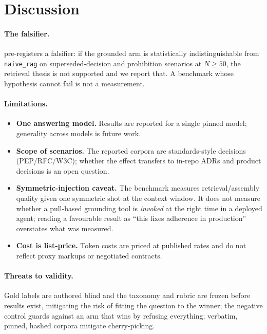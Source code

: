\section{Discussion}

\paragraph{The falsifier.} \benchname{} pre-registers a falsifier: if the grounded
arm is statistically indistinguishable from \texttt{naive\_rag} on
superseded-decision and prohibition scenarios at $N \geq 50$, the retrieval thesis
is not supported and we report that. A benchmark whose hypothesis cannot fail is
not a measurement. 

\paragraph{Limitations.}
\begin{itemize}
  \item \textbf{One answering model.} Results are reported for a single pinned
        model; generality across models is future work. 
  \item \textbf{Scope of scenarios.} The reported corpora are standards-style
        decisions (PEP/RFC/W3C); whether the effect transfers to in-repo ADRs and
        product decisions is an open question.
  \item \textbf{Symmetric-injection caveat.} The benchmark measures
        retrieval/assembly quality given one symmetric shot at the context window.
        It does not measure whether a pull-based grounding tool is \emph{invoked}
        at the right time in a deployed agent; reading a favourable result as
        ``this fixes adherence in production'' overstates what was measured.
  \item \textbf{Cost is list-price.} Token costs are priced at published rates and
        do not reflect proxy markups or negotiated contracts.
\end{itemize}

\paragraph{Threats to validity.} Gold labels are authored blind and the taxonomy
and rubric are frozen before results exist, mitigating the risk of fitting the
question to the winner; the negative control guards against an arm that wins by
refusing everything; verbatim, pinned, hashed corpora mitigate cherry-picking.
